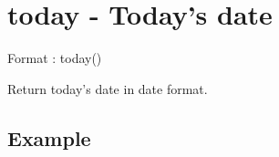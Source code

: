 %

\section{today - Today’s date\label{sect:today}}

Format : today()

Return today’s date in date format.

\subsection*{Example}


%

